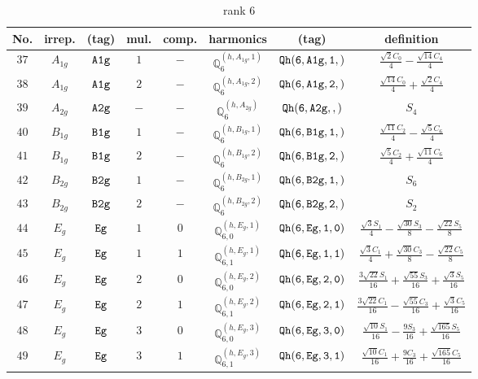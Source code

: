 \documentclass[fleqn,8pt]{jsarticle}
\begin{document}
\begin{table}[ht!]
\begin{center}
\caption{rank 6}
\renewcommand{\arraystretch}{1.3}
\begin{tabular}{cccccccc} \hline \hline
No. & irrep. & (tag) & mul. & comp. & harmonics & (tag) & definition \\ \hline
$ 37 $ & $ A_{1g} $ & $ {\tt A1g} $ & $ 1 $ & $ - $ & $ \mathbb{Q}_{6}^{(h,A_{1g},1)} $ & $ {\tt Qh(6,A1g,1,)} $ & $ \frac{\sqrt{2} C_{0}}{4} - \frac{\sqrt{14} C_{4}}{4} $ \\
$ 38 $ & $ A_{1g} $ & $ {\tt A1g} $ & $ 2 $ & $ - $ & $ \mathbb{Q}_{6}^{(h,A_{1g},2)} $ & $ {\tt Qh(6,A1g,2,)} $ & $ \frac{\sqrt{14} C_{0}}{4} + \frac{\sqrt{2} C_{4}}{4} $ \\
$ 39 $ & $ A_{2g} $ & $ {\tt A2g} $ & $ - $ & $ - $ & $ \mathbb{Q}_{6}^{(h,A_{2g})} $ & $ {\tt Qh(6,A2g,,)} $ & $ S_{4} $ \\
$ 40 $ & $ B_{1g} $ & $ {\tt B1g} $ & $ 1 $ & $ - $ & $ \mathbb{Q}_{6}^{(h,B_{1g},1)} $ & $ {\tt Qh(6,B1g,1,)} $ & $ \frac{\sqrt{11} C_{2}}{4} - \frac{\sqrt{5} C_{6}}{4} $ \\
$ 41 $ & $ B_{1g} $ & $ {\tt B1g} $ & $ 2 $ & $ - $ & $ \mathbb{Q}_{6}^{(h,B_{1g},2)} $ & $ {\tt Qh(6,B1g,2,)} $ & $ \frac{\sqrt{5} C_{2}}{4} + \frac{\sqrt{11} C_{6}}{4} $ \\
$ 42 $ & $ B_{2g} $ & $ {\tt B2g} $ & $ 1 $ & $ - $ & $ \mathbb{Q}_{6}^{(h,B_{2g},1)} $ & $ {\tt Qh(6,B2g,1,)} $ & $ S_{6} $ \\
$ 43 $ & $ B_{2g} $ & $ {\tt B2g} $ & $ 2 $ & $ - $ & $ \mathbb{Q}_{6}^{(h,B_{2g},2)} $ & $ {\tt Qh(6,B2g,2,)} $ & $ S_{2} $ \\
$ 44 $ & $ E_{g} $ & $ {\tt Eg} $ & $ 1 $ & $ 0 $ & $ \mathbb{Q}_{6,0}^{(h,E_{g},1)} $ & $ {\tt Qh(6,Eg,1,0)} $ & $ \frac{\sqrt{3} S_{1}}{4} - \frac{\sqrt{30} S_{3}}{8} - \frac{\sqrt{22} S_{5}}{8} $ \\
$ 45 $ & $ E_{g} $ & $ {\tt Eg} $ & $ 1 $ & $ 1 $ & $ \mathbb{Q}_{6,1}^{(h,E_{g},1)} $ & $ {\tt Qh(6,Eg,1,1)} $ & $ \frac{\sqrt{3} C_{1}}{4} + \frac{\sqrt{30} C_{3}}{8} - \frac{\sqrt{22} C_{5}}{8} $ \\
$ 46 $ & $ E_{g} $ & $ {\tt Eg} $ & $ 2 $ & $ 0 $ & $ \mathbb{Q}_{6,0}^{(h,E_{g},2)} $ & $ {\tt Qh(6,Eg,2,0)} $ & $ \frac{3 \sqrt{22} S_{1}}{16} + \frac{\sqrt{55} S_{3}}{16} + \frac{\sqrt{3} S_{5}}{16} $ \\
$ 47 $ & $ E_{g} $ & $ {\tt Eg} $ & $ 2 $ & $ 1 $ & $ \mathbb{Q}_{6,1}^{(h,E_{g},2)} $ & $ {\tt Qh(6,Eg,2,1)} $ & $ \frac{3 \sqrt{22} C_{1}}{16} - \frac{\sqrt{55} C_{3}}{16} + \frac{\sqrt{3} C_{5}}{16} $ \\
$ 48 $ & $ E_{g} $ & $ {\tt Eg} $ & $ 3 $ & $ 0 $ & $ \mathbb{Q}_{6,0}^{(h,E_{g},3)} $ & $ {\tt Qh(6,Eg,3,0)} $ & $ \frac{\sqrt{10} S_{1}}{16} - \frac{9 S_{3}}{16} + \frac{\sqrt{165} S_{5}}{16} $ \\
$ 49 $ & $ E_{g} $ & $ {\tt Eg} $ & $ 3 $ & $ 1 $ & $ \mathbb{Q}_{6,1}^{(h,E_{g},3)} $ & $ {\tt Qh(6,Eg,3,1)} $ & $ \frac{\sqrt{10} C_{1}}{16} + \frac{9 C_{3}}{16} + \frac{\sqrt{165} C_{5}}{16} $ \\
 \hline \hline
\end{tabular}
\end{center}
\end{table}
\end{document}
